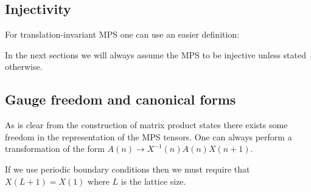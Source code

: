 \subsection{Injectivity}

    For translation-invariant MPS one can use an easier definition:

    In the next sections we will always assume the MPS to be injective unless stated otherwise.

\subsection{Gauge freedom and canonical forms}

    \begin{property}
        As is clear from the construction of matrix product states there exists some freedom in the representation of the MPS tensors. One can always perform a transformation of the form $A(n)\rightarrow X^{-1}(n)A(n)X(n+1)$.
    \end{property}
    \begin{remark}
        If we use periodic boundary conditions then we must require that $X(L+1)=X(1)$ where $L$ is the lattice size.
    \end{remark}

